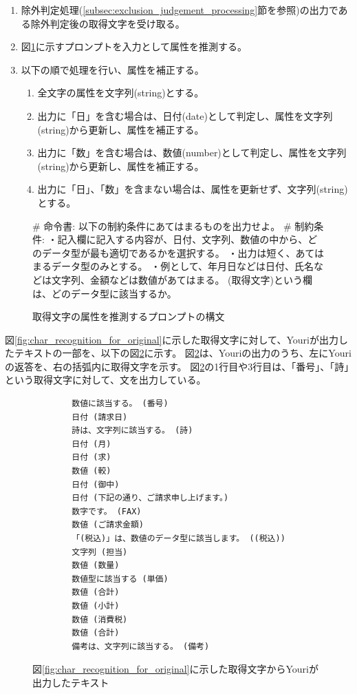 \begin{enumerate}
    \item 除外判定処理(\ref{subsec:exclusion_judgement_processing}節を参照)の出力である除外判定後の取得文字を受け取る。
    \item 図\ref{fig:prompt_struct_for_attribute_prediction}に示すプロンプトを入力として属性を推測する。
    \item 以下の順で処理を行い、属性を補正する。
        \begin{enumerate}
            \item 全文字の属性を文字列(string)とする。
            \item 出力に「日」を含む場合は、日付(date)として判定し、属性を文字列(string)から更新し、属性を補正する。
            \item 出力に「数」を含む場合は、数値(number)として判定し、属性を文字列(string)から更新し、属性を補正する。
            \item 出力に「日」、「数」を含まない場合は、属性を更新せず、文字列(string)とする。
        \end{enumerate}
\end{enumerate}

\begin{figure}[h]
    \vbox{
        \vbox{\# 命令書:}
        \vbox{以下の制約条件にあてはまるものを出力せよ。}
        \vbox{\# 制約条件:}
        \vbox{・記入欄に記入する内容が、日付、文字列、数値の中から、どのデータ型が最も適切であるかを選択する。}
        \vbox{・出力は短く、あてはまるデータ型のみとする。}
        \vbox{・例として、年月日などは日付、氏名などは文字列、金額などは数値があてはまる。}
        \vbox{(取得文字)という欄は、どのデータ型に該当するか。}
    }
    \centerline{}
    \caption{取得文字の属性を推測するプロンプトの構文}
    \label{fig:prompt_struct_for_attribute_prediction}
\end{figure}

図\ref{fig:char_recognition_for_original}に示した取得文字に対して、Youriが出力したテキストの一部を、以下の図\ref{fig:output_Youri}に示す。
図\ref{fig:output_Youri}は、Youriの出力のうち、左にYouriの返答を、右の括弧内に取得文字を示す。
図\ref{fig:output_Youri}の1行目や3行目は、「番号」、「詩」という取得文字に対して、文を出力している。

\lstset{language=}
\begin{figure}[t]
    \begin{lstlisting}
        数値に該当する。 (番号)
        日付 (請求日)
        詩は、文字列に該当する。 (詩)
        日付 (月)
        日付 (求)
        数値 (較)
        日付 (御中)
        日付 (下記の通り、ご請求申し上げます。)
        数字です。 (FAX)
        数値 (ご請求金額)
        「(税込)」は、数値のデータ型に該当します。 ((税込))
        文字列 (担当)
        数値 (数量)
        数値型に該当する (単価)
        数値 (合計)
        数値 (小計)
        数値 (消費税)
        数値 (合計)
        備考は、文字列に該当する。 (備考)
    \end{lstlisting}
    \caption{図\ref{fig:char_recognition_for_original}に示した取得文字からYouriが出力したテキスト}
    \label{fig:output_Youri}
\end{figure}

